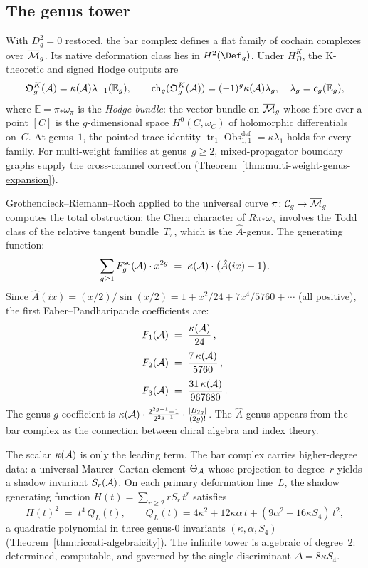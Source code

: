 \subsection*{The genus tower}

With $D_g^2 = 0$ restored, the bar complex defines a flat family of
cochain complexes over $\overline{\mathcal{M}}_g$.  Its native deformation
class lies in $H^2(\Def_g)$.  Under $H_D^K$, the K-theoretic and
signed Hodge outputs are
\[
\mathfrak O_g^K(\mathcal{A})=\kappa(\mathcal{A})\lambda_{-1}(\mathbb E_g),
\qquad
\operatorname{ch}_g(\mathfrak O_g^K(\mathcal{A}))
=(-1)^g\kappa(\mathcal{A})\lambda_g,
\quad \lambda_g=c_g(\mathbb E_g),
\]
where $\mathbb E = \pi_*\omega_\pi$ is the \emph{Hodge bundle}:
the vector bundle on $\overline{\mathcal{M}}_g$ whose fibre over a
point $[C]$ is the $g$-dimensional space
$H^0(C, \omega_C)$ of holomorphic differentials on~$C$.
At genus~$1$, the pointed trace identity
$\operatorname{tr}_1\operatorname{Obs}^{\mathrm{def}}_{1,1}
=\kappa\lambda_1$ holds for every family.  For multi-weight
families at genus~$g \geq 2$, mixed-propagator boundary graphs supply
the cross-channel correction
(Theorem~\ref{thm:multi-weight-genus-expansion}).

Grothendieck--Riemann--Roch applied to the universal curve
$\pi\colon\mathcal C_g\to\overline{\mathcal{M}}_g$ computes the
total obstruction: the Chern character of $R\pi_*\omega_\pi$
involves the Todd class of the relative tangent bundle~$T_\pi$,
which is the $\hat A$-genus. The generating function:
\[
\sum_{g\ge 1}F_g^{\mathrm{sc}}(\mathcal{A})\cdot x^{2g}
\;=\;
\kappa(\mathcal{A})\cdot\bigl(\hat A(ix)-1\bigr).
\]
Since $\hat A(ix)=(x/2)/\sin(x/2)
=1+x^2/24+7x^4/5760+\cdots$ (all positive),
the first Faber--Pandharipande coefficients are:
\begin{align*}
F_1(\mathcal{A})
&\;=\;
\frac{\kappa(\mathcal{A})}{24}\,,\\[3pt]
F_2(\mathcal{A})
&\;=\;
\frac{7\,\kappa(\mathcal{A})}{5760}\,,\\[3pt]
F_3(\mathcal{A})
&\;=\;
\frac{31\,\kappa(\mathcal{A})}{967680}\,.
\end{align*}
The genus-$g$ coefficient is
$\kappa(\mathcal{A})\cdot\tfrac{2^{2g-1}-1}{2^{2g-1}}
\cdot\tfrac{|B_{2g}|}{(2g)!}$.
The $\hat A$-genus appears from the bar complex as the connection
between chiral algebra and index theory.

The scalar $\kappa(\mathcal{A})$ is only the leading term. The bar complex
carries higher-degree data: a universal Maurer--Cartan element
$\Theta_{\mathcal{A}}$ whose projection to degree~$r$ yields a shadow invariant
$S_r(\mathcal{A})$. On each primary deformation line~$L$, the shadow
generating function $H(t)=\sum_{r\ge 2}rS_r\,t^r$ satisfies
\begin{equation}\label{eq:preface-riccati-hook}
H(t)^2 \;=\; t^4\,Q_L(t),
\qquad
Q_L(t) = 4\kappa^2+12\kappa\alpha\,t+(9\alpha^2+16\kappa S_4)\,t^2,
\end{equation}
a quadratic polynomial in three genus-$0$ invariants
$(\kappa,\alpha,S_4)$
(Theorem~\ref{thm:riccati-algebraicity}). The infinite tower is
algebraic of degree~$2$: determined, computable, and governed by the
single discriminant $\Delta = 8\kappa S_4$.

